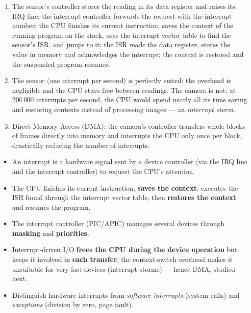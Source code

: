 \documentclass[11pt]{article}
\newcommand{\cle}[1]{{\popxbold\color{popdark}#1}}
\begin{document}
\begin{corrige}[Exercise 1]
\begin{enumerate}
\item The sensor's controller stores the reading in its data register and raises its IRQ line; the interrupt controller forwards the request with the interrupt number; the CPU finishes its current instruction, saves the context of the running program on the stack, uses the interrupt vector table to find the sensor's ISR, and jumps to it; the ISR reads the data register, stores the value in memory and acknowledges the interrupt; the context is restored and the suspended program resumes.
\item The sensor (one interrupt per second) is perfectly suited: the overhead is negligible and the CPU stays free between readings. The camera is not: at $200\,000$ interrupts per second, the CPU would spend nearly all its time saving and restoring contexts instead of processing images --- an \emph{interrupt storm}.
\item Direct Memory Access (DMA): the camera's controller transfers whole blocks of frames directly into memory and interrupts the CPU only once per block, drastically reducing the number of interrupts.
\end{enumerate}
\end{corrige}

\begin{aretenir}
\begin{itemize}
\item An \cle{interrupt} is a hardware signal sent by a device controller (via the IRQ line and the interrupt controller) to request the CPU's attention.
\item The CPU finishes its current instruction, \textbf{saves the context}, executes the \cle{ISR} found through the \cle{interrupt vector table}, then \textbf{restores the context} and resumes the program.
\item The interrupt controller (PIC/APIC) manages several devices through \textbf{masking} and \textbf{priorities}.
\item Interrupt-driven I/O \textbf{frees the CPU during the device operation} but keeps it involved in \textbf{each transfer}; the context-switch overhead makes it unsuitable for very fast devices (interrupt storms) --- hence DMA, studied next.
\item Distinguish hardware interrupts from \emph{software interrupts} (system calls) and \emph{exceptions} (division by zero, page fault).
\end{itemize}
\end{aretenir}
\end{document}
